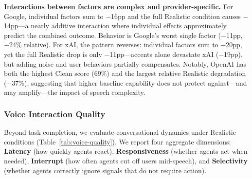 \textbf{Interactions between factors are complex and provider-specific.} For Google, individual factors sum to $-$16pp and the full Realistic condition causes $-$14pp---a nearly additive interaction where individual effects approximately predict the combined outcome. Behavior is Google's worst single factor ($-$11pp, $-$24\% relative). For xAI, the pattern reverses: individual factors sum to $-$20pp, yet the full Realistic drop is only $-$11pp---accents alone devastate xAI ($-$19pp), but adding noise and user behaviors partially compensates. Notably, OpenAI has both the highest Clean score (69\%) and the largest relative Realistic degradation ($-$37\%), suggesting that higher baseline capability does not protect against---and may amplify---the impact of speech complexity.

\subsubsection{Voice Interaction Quality}

Beyond task completion, we evaluate conversational dynamics under Realistic conditions (Table~\ref{tab:voice-quality}). We report four aggregate dimensions: \textbf{Latency} (how quickly agents react), \textbf{Responsiveness} (whether agents act when needed), \textbf{Interrupt} (how often agents cut off users mid-speech), and \textbf{Selectivity} (whether agents correctly ignore signals that do not require action).

\begin{table}[h]
\caption{Voice interaction quality (Realistic condition, aggregated across domains). \textbf{Bold} indicates best. Full breakdown in Appendix~\ref{app:voice-metrics-detail}.}
\label{tab:voice-quality}
\centering
\begin{small}
\resizebox{\columnwidth}{!}{%

}
\end{small}
\end{table}


